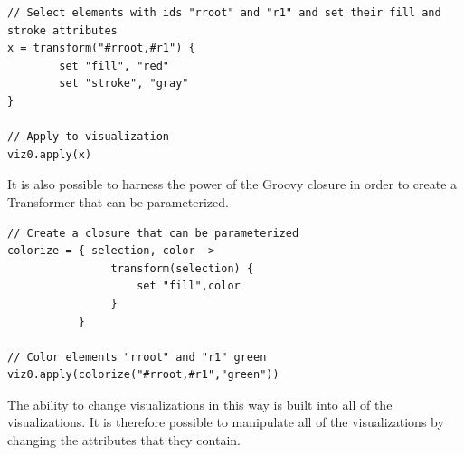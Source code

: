 \lstset{language=java}
\begin{lstlisting}[caption="Define rules for the transformation of visualization elements",label=tranformer]
// Select elements with ids "rroot" and "r1" and set their fill and stroke attributes
x = transform("#rroot,#r1") {
        set "fill", "red"
        set "stroke", "gray"
}

// Apply to visualization
viz0.apply(x)
\end{lstlisting}

It is also possible to harness the power of the Groovy closure in order to create a Transformer that can be parameterized.

\begin{lstlisting}[caption="Use Groovy closures to generate Transformers",label=transWclosure]
// Create a closure that can be parameterized
colorize = { selection, color ->
                transform(selection) {
                    set "fill",color
                }    
           }

// Color elements "rroot" and "r1" green
viz0.apply(colorize("#rroot,#r1","green"))
\end{lstlisting}

The ability to change visualizations in this way is built into all of the visualizations. It is therefore possible to manipulate all of the visualizations by changing the attributes that they contain.
